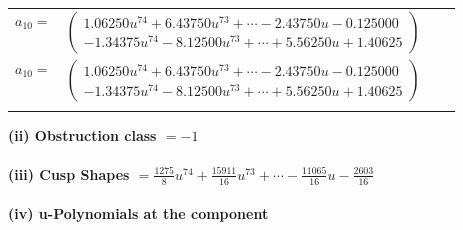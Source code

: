 \documentclass[1p]{elsarticle_modified}
\theoremstyle{definition}
\begin{document}
\begin{tabular}{m{7pt} m{180pt} m{7pt} m{180pt} }
\flushright $a_{10}=$&$\begin{pmatrix}1.06250 u^{74}+6.43750 u^{73}+\cdots-2.43750 u-0.125000\\-1.34375 u^{74}-8.12500 u^{73}+\cdots+5.56250 u+1.40625\end{pmatrix}$\\ \flushright $a_{10}=$&$\begin{pmatrix}1.06250 u^{74}+6.43750 u^{73}+\cdots-2.43750 u-0.125000\\-1.34375 u^{74}-8.12500 u^{73}+\cdots+5.56250 u+1.40625\end{pmatrix}$\\&\end{tabular}
\flushleft \textbf{(ii) Obstruction class $= -1$}\\~\\
\flushleft \textbf{(iii) Cusp Shapes $= \frac{1275}{8} u^{74}+\frac{15911}{16} u^{73}+\cdots-\frac{11065}{16} u-\frac{2603}{16}$}\\~\\
\newpage\renewcommand{\arraystretch}{1}
\flushleft \textbf{(iv) u-Polynomials at the component}\newline \\
\end{document}
